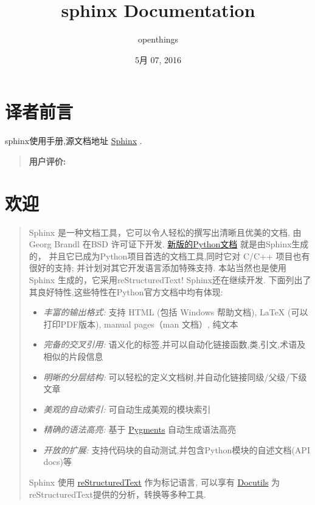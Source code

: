 \documentclass[letterpaper,10pt,english]{sphinxmanual}
\title{sphinx Documentation}
\date{5月 07, 2016}
\author{openthings}
\begin{document}
\maketitle
\tableofcontents
{}\label{contents::doc}



\chapter{译者前言}
\label{index:id1}\label{index:sphinx}\label{index:contents}\label{index::doc}
sphinx使用手册,源文档地址 \href{http://sphinx.pocoo.org/}{Sphinx} .
\begin{quote}

\textbf{用户评价:}
\end{quote}


\chapter{欢迎}
\label{index:id2}\begin{quote}

Sphinx 是一种文档工具，它可以令人轻松的撰写出清晰且优美的文档, 由 Georg Brandl 在BSD 许可证下开发.
\href{http://docs.python.org/}{新版的Python文档} 就是由Sphinx生成的，
并且它已成为Python项目首选的文档工具,同时它对 C/C++ 项目也有很好的支持; 并计划对其它开发语言添加特殊支持.
本站当然也是使用 Sphinx 生成的，它采用reStructuredText!
Sphinx还在继续开发. 下面列出了其良好特性,这些特性在Python官方文档中均有体现:
\begin{itemize}
\item {} 
\emph{丰富的输出格式:} 支持 HTML (包括 Windows 帮助文档), LaTeX (可以打印PDF版本), manual pages（man 文档）, 纯文本

\item {} 
\emph{完备的交叉引用:} 语义化的标签,并可以自动化链接函数,类,引文,术语及相似的片段信息

\item {} 
\emph{明晰的分层结构:} 可以轻松的定义文档树,并自动化链接同级/父级/下级文章

\item {} 
\emph{美观的自动索引:} 可自动生成美观的模块索引

\item {} 
\emph{精确的语法高亮:} 基于 \href{http://pygments.org/}{Pygments} 自动生成语法高亮

\item {} 
\emph{开放的扩展:} 支持代码块的自动测试,并包含Python模块的自述文档(API docs)等

\end{itemize}

Sphinx 使用 \href{http://docutils.sf.net/rst.html}{reStructuredText}
作为标记语言, 可以享有 \href{http://docutils.sf.net/}{Docutils} 为reStructuredText提供的分析，转换等多种工具.
\end{quote}
\end{document}
